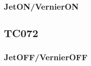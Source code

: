 \documentclass[12pt]{article}
\begin{document}
\subsubsection{JetON/VernierON}

\subsection{\textbf{TC072}}\label{sec:TC072}

\subsubsection{JetOFF/VernierOFF}
\end{document}
